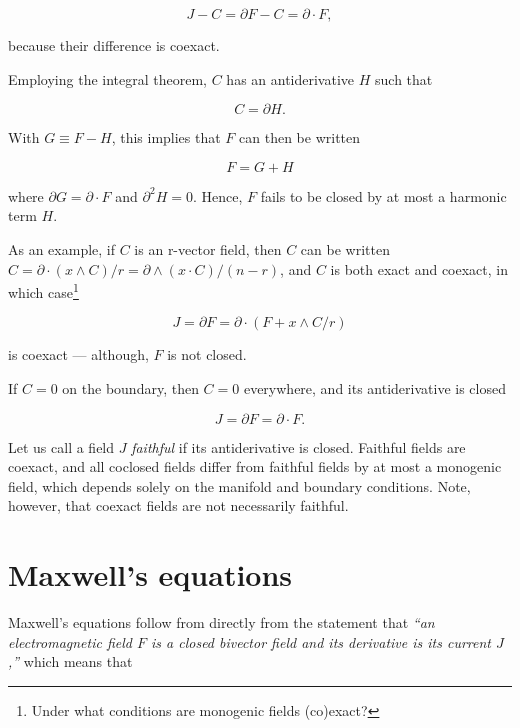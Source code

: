 \documentclass{article}
\begin{document}
\begin{equation}
  J - C = \partial F - C = \partial \cdot F,\label{eq:cohomologous}
\end{equation}

because their difference is coexact.

Employing the integral theorem, $C$ has an antiderivative $H$ such that 

\begin{equation}
  C = \partial H.
\end{equation}

With $G \equiv F - H$, this implies that $F$ can then be written

\begin{equation}
  F = G + H\label{eq:harmonic-split}
\end{equation}

where $\partial G = \partial \cdot F$ and $\partial^2 H = 0$. Hence, $F$ fails to be closed by at most a harmonic term $H$.

As an example, if $C$ is an r-vector field, then $C$ can be written $C = \partial \cdot (x \wedge C)/r = \partial \wedge (x \cdot C)/(n-r)$, and $C$ is both exact and coexact, in which case\footnote{Under what conditions are monogenic fields (co)exact?}

\begin{equation}
  J = \partial F = \partial \cdot (F + x \wedge C/r)
\end{equation}

is coexact --- although, $F$ is not closed. 

If $C = 0$ on the boundary, then $C = 0$ everywhere, and its antiderivative is closed

\begin{equation}
  J = \partial F = \partial \cdot F. \label{eq:faithful}
\end{equation}

Let us call a field $J$ \emph{faithful} if its antiderivative is closed. Faithful fields are coexact, and all coclosed fields differ from faithful fields by at most a monogenic field, which depends solely on the manifold and boundary conditions. Note, however, that coexact fields are not necessarily faithful.

\section{Maxwell's equations}

Maxwell's equations follow from directly from the statement that \emph{``an electromagnetic field $F$ is a closed bivector field and its derivative is its current $J$,''} which means that
\end{document}
